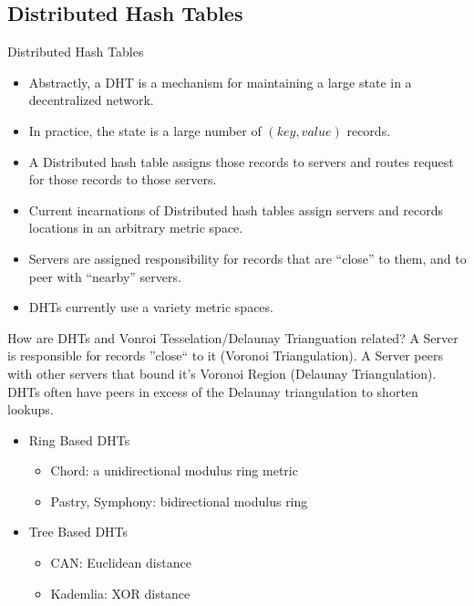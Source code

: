 \documentclass[8pt]{beamer}
\begin{document}
\subsection{Distributed Hash Tables}
	\begin{frame}{Distributed Hash Tables}
		\begin{itemize}
			\item Abstractly, a DHT is a mechanism for maintaining a large state in a decentralized network.
			\item In practice, the state is a large number of $ (key, value) $ records.
			\item A Distributed hash table assigns those records to servers and routes request for those records to those servers.
			\item Current incarnations of Distributed hash tables assign servers and records locations in an arbitrary metric space.
			\item Servers are assigned responsibility for records that are ``close'' to them, and to peer with ``nearby'' servers.
			\item DHTs currently use a variety metric spaces.
		\end{itemize}


	\end{frame}
	
\begin{frame}{How are DHTs and Vonroi Tesselation/Delaunay Trianguation related?}
	A Server is responsible for records ''close`` to it (Voronoi Triangulation).
	A Server peers with other servers that bound it's Voronoi Region (Delaunay Triangulation).
	DHTs often have peers in excess of the Delaunay triangulation to shorten lookups.
	
	\begin{itemize}
		\item Ring Based DHTs
		\begin{itemize}
			\item Chord: a unidirectional modulus ring metric
			\item Pastry, Symphony: bidirectional modulus ring
		\end{itemize}
		\item Tree Based DHTs
		\begin{itemize}
			\item CAN: Euclidean distance
			\item Kademlia: XOR distance
		\end{itemize}
	\end{itemize}
\end{frame}
\end{document}
